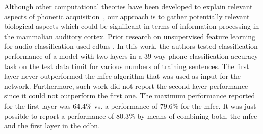 \documentclass[10pt,letterpaper]{article}
\begin{document}



Although other computational theories have been developed to explain relevant aspects of phonetic acquisition~\cite{rasanen_2012}, our approach is to gather potentially relevant biological aspects which could be significant in terms of information processing in the mammalian auditory cortex. Prior research on unsupervised feature learning for audio classification used \glspl{cdbn} \cite{Lee:2009:UFL:2984093.2984217}. 
In this work, the authors tested classification performance of a model with two layers in a 39-way phone classification accuracy task on the test data \gls{timit} for various numbers of training sentences.
The first layer never outperformed the \gls{mfcc} algorithm that was used as input for the network.
Furthermore, such work did not report the second layer performance since it could not outperform the first one.
The maximum performance reported for the first layer was 64.4\% vs. a performance of 79.6\% for the \gls{mfcc}.
It was just possible to report a performance of 80.3\% by means of combining both, the \gls{mfcc} and the first layer in the \gls{cdbn}.
\end{document}

